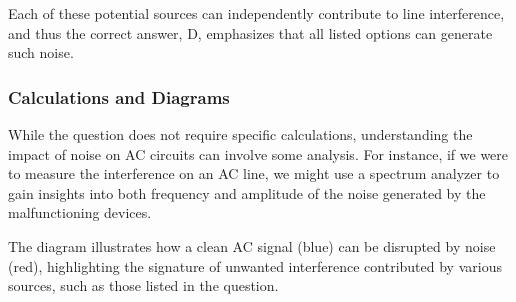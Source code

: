 Each of these potential sources can independently contribute to line interference, and thus the correct answer, D, emphasizes that all listed options can generate such noise.

\subsubsection{Calculations and Diagrams}

While the question does not require specific calculations, understanding the impact of noise on AC circuits can involve some analysis. For instance, if we were to measure the interference on an AC line, we might use a spectrum analyzer to gain insights into both frequency and amplitude of the noise generated by the malfunctioning devices.


The diagram illustrates how a clean AC signal (blue) can be disrupted by noise (red), highlighting the signature of unwanted interference contributed by various sources, such as those listed in the question.
